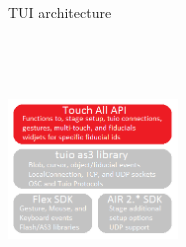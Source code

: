 \begin{frame}%
\begin{block}{TUI architecture}
\begin{minipage}{1.0\linewidth}
\begin{center}
\begin{minipage}{.49\linewidth}
\includegraphics[height=70mm, width=45mm]{images/API&tuioas3lib&skds.png}$\;$ 
\end{minipage}
%
\begin{minipage}{.49\linewidth}

\end{minipage}
\end{center}
\end{minipage}
\end{block}
\end{frame}
